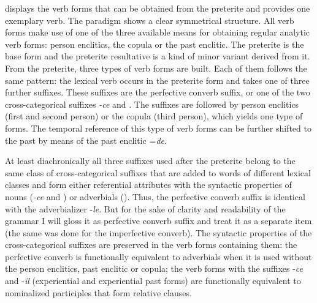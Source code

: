 displays the verb forms that can be obtained from the preterite and  provides one exemplary verb. The paradigm shows a clear symmetrical structure. All verb forms make use of one of the three available means for obtaining regular analytic verb forms: person enclitics, the copula  or the past enclitic. The preterite is the base form and the preterite resultative is a kind of minor variant derived from it. From the preterite, three types of verb forms are built. Each of them follows the same pattern: the lexical verb occurs in the preterite form and takes one of three further suffixes. These suffixes are the perfective converb suffix, or one of the two cross-categorical suffixes \textit{-ce} and . The suffixes are followed by person enclitics (first and second person) or the copula (third person), which yields one type of forms. The temporal reference of this type of verb forms can be further shifted to the past by means of the past enclitic =\textit{de}. 

At least diachronically all three suffixes used after the preterite belong to the same class of cross-categorical suffixes that are added to words of different lexical classes and form either referential attributes with the syntactic properties of nouns (\textit{-ce} and ) or adverbials (). Thus, the perfective converb suffix is identical with the adverbializer -\textit{le}. But for the sake of clarity and readability of the grammar I will gloss it as perfective converb suffix and treat it as a separate item (the same was done for the imperfective converb). The syntactic properties of the cross-categorical suffixes are preserved in the verb forms containing them: the perfective converb is functionally equivalent to adverbials when it is used without the person enclitics, past enclitic or copula; the verb forms with the suffixes -\textit{ce} and -\textit{il} (experiential and experiential past forms) are functionally equivalent to nominalized participles that form relative clauses.


